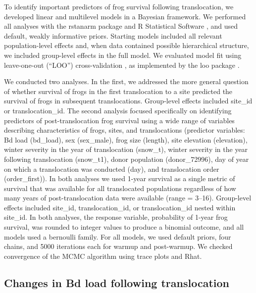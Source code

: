 \documentclass[9pt,twocolumn,twoside,lineno]{pnas-new}
\begin{document}
{To identify important predictors of frog survival following
translocation, we developed linear and multilevel models in a Bayesian
framework. We performed all analyses with the rstanarm package
\citep{rstanarm2022} and R Statistical Software
\citep[v4.4.4,][]{rsoftware2022}, and used default, weakly informative
priors. Starting models included all relevant population-level effects
and, when data contained possible hierarchical structure, we included
group-level effects in the full model. We evaluated model fit using
leave-one-out (``LOO'') cross-validation
\citep{gelman2013, gabry2019, vehtari2016}, as implemented by the loo
package \citep{vehtari2022}.

We conducted two analyses. In the first, we addressed the more general
question of whether survival of frogs in the first translocation to a
site predicted the survival of frogs in subsequent translocations.
Group-level effects included site\_id or translocation\_id. The second
analysis focused specifically on identifying predictors of
post-translocation frog survival using a wide range of variables
describing characteristics of frogs, sites, and translocations
(predictor variables: Bd load (bd\_load), sex (sex\_male), frog size
(length), site elevation (elevation), winter severity in the year of
translocation (snow\_t), winter severity in the year following
translocation (snow\_t1), donor population (donor\_72996), day of year
on which a translocation was conducted (day), and translocation order
(order\_first)). In both analyses we used 1-year survival as a single
metric of survival that was available for all translocated populations
regardless of how many years of post-translocation data were available
(range = 3--16). Group-level effects included site\_id,
translocation\_id, or translocation\_id nested within site\_id. In both
analyses, the response variable, probability of 1-year frog survival,
was rounded to integer values to produce a binomial outcome, and all
models used a bernoulli family. For all models, we used default priors,
four chains, and 5000 iterations each for warmup and post-warmup. We
checked convergence of the MCMC algorithm using trace plots and Rhat.

\hypertarget{changes-in-bd-load-following-translocation}{%
\subsection*{Changes in Bd load following
translocation}\label{changes-in-bd-load-following-translocation}}

}
\end{document}
